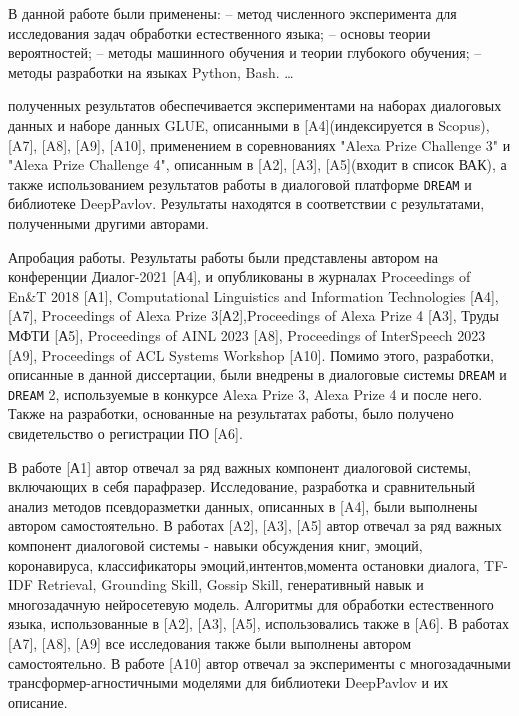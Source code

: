 {\methods}
В данной работе были
применены:
– метод численного эксперимента для исследования задач обработки естественного языка;
– основы теории вероятностей;
– методы машинного обучения и теории глубокого обучения;
– методы разработки на языках Python, Bash.
\ldots




{\reliability} полученных результатов обеспечивается экспериментами на наборах диалоговых данных и наборе данных GLUE, описанными в [A4](индексируется в Scopus), [A7], [A8], [A9], [A10], применением в соревнованиях "Alexa Prize Challenge 3" и "Alexa Prize Challenge 4", описанным в [A2], [A3], [A5](входит в список ВАК), а также использованием результатов работы в диалоговой платформе \texttt{DREAM} и библиотеке DeepPavlov. Результаты находятся в соответствии с результатами, полученными другими авторами.


{\probation}
Апробация работы. Результаты работы были представлены автором на конференции Диалог-2021 [А4], и опубликованы в журналах Proceedings of En\&T 2018 [А1], Computational Linguistics and Information Technologies [А4],[A7], Proceedings of Alexa Prize 3[А2],Proceedings of Alexa Prize 4 [А3], Труды МФТИ [А5], Proceedings of AINL 2023 [A8], Proceedings of InterSpeech 2023 [A9], Proceedings of ACL Systems Workshop [A10]. Помимо этого, разработки, описанные в данной диссертации, были внедрены в диалоговые системы \texttt{DREAM} и \texttt{DREAM} 2, используемые в конкурсе Alexa Prize 3, Alexa Prize 4 и после него. Также на разработки, основанные на результатах работы, было получено свидетельство о регистрации ПО [A6].


{\contribution} В работе [А1] автор отвечал за ряд важных компонент диалоговой системы, включающих в себя парафразер. Исследование, разработка и сравнительный анализ методов псевдоразметки данных, описанных в [A4], были выполнены автором самостоятельно. В работах [A2], [A3], [A5] автор отвечал за ряд важных компонент диалоговой системы - навыки обсуждения книг, эмоций, коронавируса, классификаторы эмоций,интентов,момента остановки диалога, TF-IDF Retrieval, Grounding Skill, Gossip Skill, генеративный навык и многозадачную нейросетевую модель. Алгоритмы для обработки естественного языка, использованные в [A2], [A3], [A5], использовались также в [A6]. В работах [A7], [A8], [A9] все исследования также были выполнены автором самостоятельно. В работе [A10] автор отвечал за эксперименты с многозадачными трансформер-агностичными моделями для библиотеки DeepPavlov и их описание.

